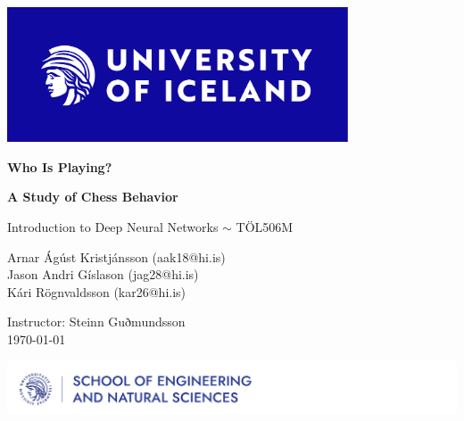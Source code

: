 \documentclass{article}
\begin{document}
\begin{titlepage}

\setcounter{page}{1}
\begin{center}
\null
\vspace{0.45cm}
\begin{center}
    \includegraphics[height=4cm]{figures/hi_logo_new.pdf}
\end{center}

{\vspace{4cm} \huge\bf
Who Is Playing?\\\vspace{12pt}
\par}
{\vspace{0.5cm}
\Large\bf
A Study of Chess Behavior\par}

{\vspace{1 cm} \Large
Introduction to Deep Neural Networks $\sim$ TÖL506M}


{\vspace{18pt} \Large 
Arnar Ágúst Kristjánsson (aak18@hi.is)\\
Jason Andri Gíslason (jag28@hi.is)\\
Kári Rögnvaldsson (kar26@hi.is)
\par}

{\vspace{6 cm}\Large 
Instructor: Steinn Guðmundsson \\
\today
\par}
\vspace{1cm}
\includegraphics[scale = 0.5]{figures/von_logo.pdf}
\end{center}
\end{titlepage}
\tableofcontents





\newpage
\thispagestyle{empty}


\newpage

\newpage
% 
\end{document}
